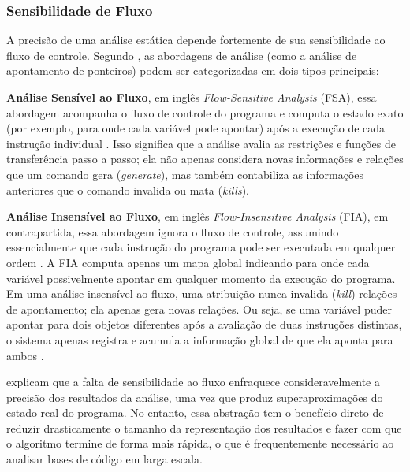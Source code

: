 \documentclass[
    12pt,                %
    openright,           %
    oneside,             %
    a4paper,             %
    english,             %
    brazil               %
]{abntex2}
\begin{document}
\begin{itemize}
\subsubsection{Sensibilidade de Fluxo}
\label{sec:sensifluxo}
\par
A precisão de uma análise estática depende fortemente de sua sensibilidade ao fluxo de controle.
Segundo , as abordagens de análise (como a análise de apontamento de ponteiros) podem ser categorizadas em dois tipos principais:
\par
\textbf{Análise Sensível ao Fluxo}, em inglês \textit{Flow-Sensitive Analysis} (FSA), essa abordagem acompanha o fluxo de controle do programa e computa o estado exato (por exemplo, para onde cada variável pode apontar) após a execução de cada instrução individual .
Isso significa que a análise avalia as restrições e funções de transferência passo a passo; ela não apenas considera novas informações e relações que um comando gera (\textit{generate}), mas também contabiliza as informações anteriores que o comando invalida ou mata (\textit{kills}).
\par
\textbf{Análise Insensível ao Fluxo}, em inglês \textit{Flow-Insensitive Analysis} (FIA), em contrapartida, essa abordagem ignora o fluxo de controle, assumindo essencialmente que cada instrução do programa pode ser executada em qualquer ordem \cite{aho2007compilers}.
A FIA computa apenas um mapa global indicando para onde cada variável possivelmente apontar em qualquer momento da execução do programa.
Em uma análise insensível ao fluxo, uma atribuição nunca invalida (\textit{kill}) relações de apontamento; ela apenas gera novas relações. Ou seja, se uma variável puder apontar para dois objetos diferentes após a avaliação de duas instruções distintas, o sistema apenas registra e acumula a informação global de que ela aponta para ambos \cite{aho2007compilers}.
\par
{} explicam que a falta de sensibilidade ao fluxo enfraquece consideravelmente a precisão dos resultados da análise, uma vez que produz superaproximações do estado real do programa. 
No entanto, essa abstração tem o benefício direto de reduzir drasticamente o tamanho da representação dos resultados e fazer com que o algoritmo termine de forma mais rápida, o que é frequentemente necessário ao analisar bases de código em larga escala.


\end{itemize}
\end{document}
